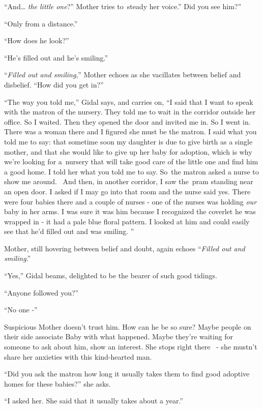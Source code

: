 \documentclass[twoside,11pt]{book}
\begin{document}
``And{\dots} \textit{the little one}?'' Mother tries to~steady her voice.'' Did
you see him?''

``Only from a distance.''

``How does he look?''

``He's filled out and he's smiling.''

``\textit{Filled out and smiling},'' Mother echoes as she vacillates between belief and
disbelief. ``How did you get in?''

``The way you told me,'' Gidal says, and carries on, ``I said that I want to
speak with the matron of the nursery. They told me to wait in the corridor outside her office. So I waited. Then they
opened the door and invited me in. So I went in. There was a woman there and I figured she must be the matron. I said
what you told me to say: that sometime soon my daughter is due to give birth as a single mother, and that she would
like to give up her baby for adoption, which is why we're looking for a~nursery that will take good care of the little
one and find him a good home. I told her what you told me to say. So~the matron asked a nurse to show me around.~ And
then, in another corridor, I saw the~pram standing near an open door. I asked if I may go into that room and the nurse
said yes. There were four babies there and a couple of nurses - one of the nurses was holding\textit{ our }baby in her
arms. I was sure it was him because I recognized the coverlet he was wrapped in - it had a pale blue floral pattern. I
looked at him and could easily see that he'd filled out and was smiling. ''

Mother, still hovering between belief and doubt, again{ }echoes ``\textit{Filled
out and smiling}.''

``Yes,'' Gidal beams, delighted to be the bearer of such good tidings.

``Anyone followed you?''

``No one -''

Suspicious{ }Mother doesn't trust him. How can he be so sure? Maybe people on
their side associate Baby with what happened. Maybe they're waiting for someone to ask about him, show an interest. She
stops right there \ {}- she mustn't share her anxieties with this kind-hearted man.

``Did you ask the matron how long it usually takes them to find good adoptive homes for these
babies?'' she asks.

``I asked her. She said that it usually takes about a year.''
\end{document}
